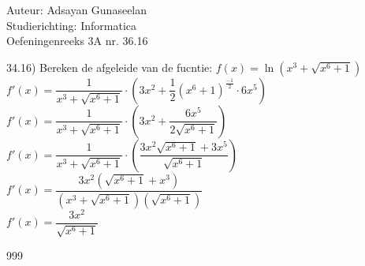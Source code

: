\documentclass[a4paper]{article}
\begin{document}
\noindent \large Auteur: Adsayan Gunaseelan \\
\noindent \large Studierichting: Informatica\\
\noindent \large Oefeningenreeks 3A nr. 36.16\\

\medskip

\normalsize
34.16) Bereken de afgeleide van de fucntie: $f(x) = \ln(x^3 + \sqrt{x^6+1})$\\

$f'(x) =  \dfrac{1}{x^3+\sqrt{x^6+1}}\cdot(3x^2+\dfrac{1}{2}(x^6+1)^\tfrac{-1}{2}\cdot6x^5)$\\

$f'(x) =  \dfrac{1}{x^3+\sqrt{x^6+1}}\cdot(3x^2+\dfrac{6x^5}{2\sqrt{x^6+1}})$\\

$f'(x) =  \dfrac{1}{x^3+\sqrt{x^6+1}}\cdot\left(\dfrac{3x^2\sqrt{x^6+1}+3x^5}{\sqrt{x^6+1}}\right)$\\

$f'(x) =  \dfrac{3x^2(\sqrt{x^6+1}+x^3)}{(x^3+\sqrt{x^6+1})(\sqrt{x^6+1})}$\\

$f'(x) =  \dfrac{3x^2}{\sqrt{x^6+1}}$\\

\begin{thebibliography}{999}
\end{thebibliography}
\end{document}
